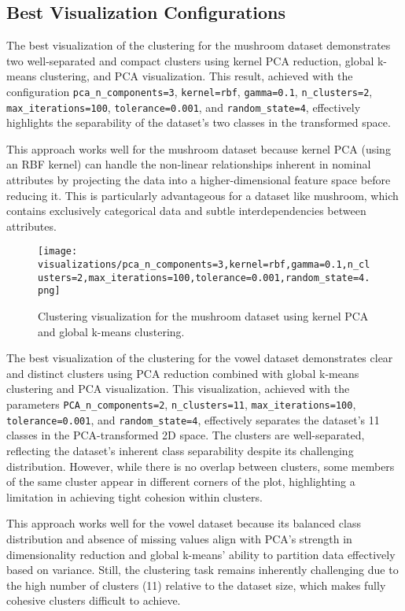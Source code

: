 \subsection{Best Visualization Configurations}
\label{subsec:best-visualization-configs}

The best visualization of the clustering for the mushroom dataset demonstrates two well-separated and compact clusters using kernel PCA reduction, global k-means clustering, and PCA visualization. This result, achieved with the configuration \texttt{pca\_n\_components=3}, \texttt{kernel=rbf}, \texttt{gamma=0.1}, \texttt{n\_clusters=2}, \texttt{max\_iterations=100}, \texttt{tolerance=0.001}, and \texttt{random\_state=4}, effectively highlights the separability of the dataset's two classes in the transformed space.

This approach works well for the mushroom dataset because kernel PCA (using an RBF kernel) can handle the non-linear relationships inherent in nominal attributes by projecting the data into a higher-dimensional feature space before reducing it. This is particularly advantageous for a dataset like mushroom, which contains exclusively categorical data and subtle interdependencies between attributes.

\begin{figure}[h!]
    \centering
    \texttt{[image: visualizations/pca\_n\_components=3,kernel=rbf,gamma=0.1,n\_clusters=2,max\_iterations=100,tolerance=0.001,random\_state=4.png]}
    \caption{Clustering visualization for the mushroom dataset using kernel PCA and global k-means clustering.}
    \label{fig:mushroom_clustering}
\end{figure}

The best visualization of the clustering for the vowel dataset demonstrates clear and distinct clusters using PCA reduction combined with global k-means clustering and PCA visualization. This visualization, achieved with the parameters \texttt{PCA\_n\_components=2}, \texttt{n\_clusters=11}, \texttt{max\_iterations=100}, \texttt{tolerance=0.001}, and \texttt{random\_state=4}, effectively separates the dataset's 11 classes in the PCA-transformed 2D space. The clusters are well-separated, reflecting the dataset's inherent class separability despite its challenging distribution. However, while there is no overlap between clusters, some members of the same cluster appear in different corners of the plot, highlighting a limitation in achieving tight cohesion within clusters.

This approach works well for the vowel dataset because its balanced class distribution and absence of missing values align with PCA’s strength in dimensionality reduction and global k-means’ ability to partition data effectively based on variance. Still, the clustering task remains inherently challenging due to the high number of clusters (11) relative to the dataset size, which makes fully cohesive clusters difficult to achieve.

